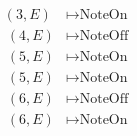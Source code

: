 \documentclass[preview]{standalone}
\begin{document}
\begin{align*}
(3,E) & \mapsto \text{NoteOn} \\ \
        (4,E) & \mapsto \text{NoteOff} \\ \
        (5,E) & \mapsto \text{NoteOn} \\ \
        (5,E) & \mapsto \text{NoteOn} \\ \
        (6,E) & \mapsto \text{NoteOff} \\ \
        (6,E) & \mapsto \text{NoteOn} \\
\end{align*}
\end{document}
